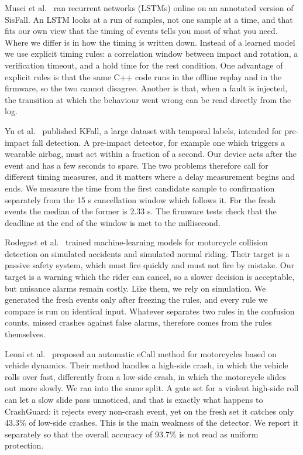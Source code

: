 \documentclass[10pt,a4paper]{article}
\begin{document}
Musci et al.~\cite{musci} ran recurrent networks (LSTMs) online on an annotated version of SisFall. An LSTM looks at a run of samples, not one sample at a time, and that fits our own view that the timing of events tells you most of what you need. Where we differ is in how the timing is written down. Instead of a learned model we use explicit timing rules: a correlation window between impact and rotation, a verification timeout, and a hold time for the rest condition. One advantage of explicit rules is that the same C++ code runs in the offline replay and in the firmware, so the two cannot disagree. Another is that, when a fault is injected, the transition at which the behaviour went wrong can be read directly from the log.

Yu et al.~\cite{kfall} published KFall, a large dataset with temporal labels, intended for pre-impact fall detection. A pre-impact detector, for example one which triggers a wearable airbag, must act within a fraction of a second. Our device acts after the event and has a few seconds to spare. The two problems therefore call for different timing measures, and it matters where a delay measurement begins and ends. We measure the time from the first candidate sample to confirmation separately from the 15 s cancellation window which follows it. For the fresh events the median of the former is 2.33 s. The firmware tests check that the deadline at the end of the window is met to the millisecond.

Rodegast et al.~\cite{rodegast2024} trained machine-learning models for motorcycle collision detection on simulated accidents and simulated normal riding. Their target is a passive safety system, which must fire quickly and must not fire by mistake. Our target is a warning which the rider can cancel, so a slower decision is acceptable, but nuisance alarms remain costly. Like them, we rely on simulation. We generated the fresh events only after freezing the rules, and every rule we compare is run on identical input. Whatever separates two rules in the confusion counts, missed crashes against false alarms, therefore comes from the rules themselves.

Leoni et al.~\cite{ecall2025} proposed an automatic eCall method for motorcycles based on vehicle dynamics. Their method handles a high-side crash, in which the vehicle rolls over fast, differently from a low-side crash, in which the motorcycle slides out more slowly. We ran into the same split. A gate set for a violent high-side roll can let a slow slide pass unnoticed, and that is exactly what happens to CrashGuard: it rejects every non-crash event, yet on the fresh set it catches only 43.3\% of low-side crashes. This is the main weakness of the detector. We report it separately so that the overall accuracy of 93.7\% is not read as uniform protection.
\end{document}
